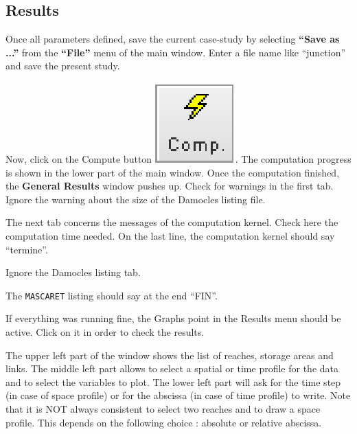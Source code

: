 \documentclass[a4paper,12pt]{article}
\begin{document}
\subsection{Results}

\hspace{0.5cm}Once all parameters defined, save the current case-study by selecting
\textbf{{}``Save as ...''} from the \textbf{{}``File''} menu of
the main window. Enter a file name like {}``junction'' and save
the present study.

\vspace{0.5cm}

Now, click on the Compute button \includegraphics[scale=0.6]{compute}.
The computation progress is shown in the lower part of the main window.
Once the computation finished, the \textbf{General Results} window
pushes up. Check for warnings in the first tab. Ignore the warning
about the size of the Damocles listing file. 

\vspace{0.5cm}

The next tab concerns the messages of the computation kernel. Check
here the computation time needed. On the last line, the computation
kernel should say {}``termine''.

\vspace{0.5cm}

Ignore the Damocles listing tab.

\vspace{0.5cm}

The \texttt{MASCARET} listing should say at the end {}``FIN''.

\vspace{0.5cm}

If everything was running fine, the Graphs point in the Results menu
should be active. Click on it in order to check the results.

\vspace{0.5cm}

The upper left part of the window shows the list of reaches, storage
areas and links. The middle left part allows to select a spatial
or time profile for the data and to select the variables to plot.
The lower left part will ask for the time step (in case of space profile)
or for the abscissa (in case of time profile) to write. Note that
it is NOT always consistent to select two reaches and to draw a space
profile. This depends on the following choice : absolute or relative abscissa.
\end{document}
